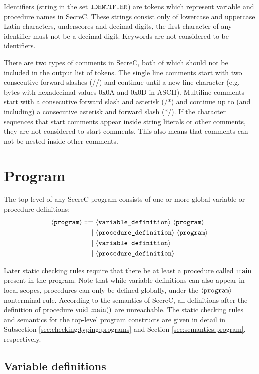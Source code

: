 \documentclass[a4paper, 10pt, draft]{report}
\newcommand{\mycode}[1]{\ensuremath{\mbox{\lstinline{#1}}}}
\newcommand{\grammarRules}[1]{\small{\singlespacing\vspace{-2em}\begin{align*}#1\end{align*}}}
\newcommand{\bnfNT}[1]{\ensuremath{\mathbf{\left\langle\mbox{\texttt{#1}}\right\rangle}}}
\newcommand{\bnfM}[1]{\ensuremath{\mbox{\textcolor{black}{\texttt{\uppercase{#1}}}}}} %
\begin{document}
Identifiers (string in the set \bnfM{IDENTIFIER}) are tokens which represent
variable and procedure names in SecreC. These strings consist only of lowercase
and uppercase Latin characters, underscores and decimal digits, the first
character of any identifier must not be a decimal digit. Keywords are not
considered to be identifiers.

There are two types of comments in SecreC, both of which should not be included
in the output list of tokens. The single line comments start with two
consecutive forward slashes (//) and continue until a new line character (e.g.
bytes with hexadecimal values 0x0A and 0x0D in ASCII). Multiline comments start
with a consecutive forward slash and asterisk (/*) and continue up to (and
including) a consecutive asterisk and forward slash (*/). If the character
sequences that start comments appear inside string literals or other comments,
they are not considered to start comments. This also means that comments can
not be nested inside other comments.

\section{Program}\label{sec:grammar:program}
The top-level of any SecreC program consists of one or more global variable or
procedure definitions:
\grammarRules{
  \bnfNT{program} ::=&\ \bnfNT{variable\_definition}\ \bnfNT{program} \\
                    |&\ \bnfNT{procedure\_definition}\ \bnfNT{program} \\
                    |&\ \bnfNT{variable\_definition} \\
                    |&\ \bnfNT{procedure\_definition}
}

Later static checking rules require that there be at least a procedure called
\mycode{main} present in the program. Note that while variable definitions can
also appear in local scopes, procedures can only be defined globally, under the
\bnfNT{program} nonterminal rule. According to the semantics of SecreC, all
definitions after the definition of procedure \mycode{void main()} are
unreachable.  The static checking rules and semantics for the top-level program
constructs are given in detail in Subsection \ref{sec:checking:typing:programs}
and Section \ref{sec:semantics:program}, respectively.

\subsection{Variable definitions}\label{sec:grammar:vardef}
\end{document}
